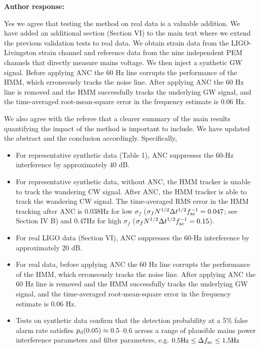 \documentclass[10pt]{article}
\begin{document}
\begin{enumerate}[A.]
	\textbf{Author response:} 
	
Yes we agree that testing the method on real data is a valuable addition. We have added an additional section (Section VI) to the main text where we extend the previous validation tests to real data. We obtain strain data from the LIGO-Livingston strain channel and reference data from the nine independent PEM channels that directly measure mains voltage. We then inject a synthetic GW signal. Before applying ANC the 60 Hz line corrupts the performance of the HMM, which erroneously tracks the noise line. After applying ANC the 60 Hz line is removed and the HMM successfully tracks the underlying GW signal, and the time-averaged root-mean-square error in the frequency estimate is $0.06$ Hz. 


We also agree with the referee that a clearer summary of the main results quantifying the impact of the method is important to include. We have updated the abstract and the conclusion accordingly. Specifically,
\begin{itemize}
	\item For representative synthetic data (Table 1), ANC suppresses the 60-Hz interference by approximately 40 dB.
	
	
	\item For representative synthetic data, without ANC, the HMM tracker is unable to track the wandering CW signal. After ANC, the HMM tracker is able to track the wandering CW signal. The time-averaged RMS error in the HMM tracking after ANC is 0.038Hz for low $\sigma_f$ ($\sigma_f N^{1/2} \Delta t^{1/2} f_{\rm ac}^{-1} = 0.047$; see Section IV B) and $0.47$Hz for high $\sigma_f$ ($\sigma_f N^{1/2} \Delta t^{1/2} f_{\rm ac}^{-1} = 0.15$).
	
	\item For real LIGO data (Section VI), ANC suppresses the 60-Hz interference by approximately 20 dB.
	
	\item For real data, before applying ANC the 60 Hz line corrupts the performance of the HMM, which erroneously tracks the noise line. After applying ANC the 60 Hz line is removed and the HMM successfully tracks the underlying GW signal, and the time-averaged root-mean-square error in the frequency estimate is $0.06$ Hz. 
	
	\item Tests on synthetic data confirm that the detection probability at a 5\% false alarm rate satisfies $p_{\rm d}(0.05) \approx 0.5 $--$0.6$ across a range of plausible mains power interference parameters and filter parameters, e.g. $ 0.5 \text{Hz} \leq \Delta f_{\rm ac} \leq 1.5 \text{Hz}$

\end{itemize}



	
	
	
\end{enumerate}
\end{document}
